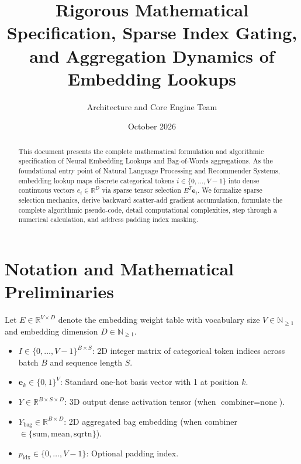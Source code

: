 \documentclass[11pt,a4paper]{article}
\title{\textbf{Rigorous Mathematical Specification, Sparse Index Gating, and Aggregation Dynamics of Embedding Lookups}}
\author{Architecture and Core Engine Team}
\date{October 2026}
\theoremstyle{definition}
\begin{document}
\maketitle

\begin{abstract}
This document presents the complete mathematical formulation and algorithmic specification of Neural Embedding Lookups and Bag-of-Words aggregations. As the foundational entry point of Natural Language Processing and Recommender Systems, embedding lookup maps discrete categorical tokens $i \in \{0, \dots, V-1\}$ into dense continuous vectors $e_i \in \mathbb{R}^D$ via sparse tensor selection $E^T \mathbf{e}_i$. We formalize sparse selection mechanics, derive backward scatter-add gradient accumulation, formulate the complete algorithmic pseudo-code, detail computational complexities, step through a numerical calculation, and address padding index masking.
\end{abstract}

\section{Notation and Mathematical Preliminaries}

Let $E \in \mathbb{R}^{V \times D}$ denote the embedding weight table with vocabulary size $V \in \mathbb{N}_{\ge 1}$ and embedding dimension $D \in \mathbb{N}_{\ge 1}$.

\begin{itemize}
    \item $I \in \{0, \dots, V-1\}^{B \times S}$: 2D integer matrix of categorical token indices across batch $B$ and sequence length $S$.
    \item $\mathbf{e}_k \in \{0, 1\}^V$: Standard one-hot basis vector with 1 at position $k$.
    \item $Y \in \mathbb{R}^{B \times S \times D}$: 3D output dense activation tensor (when $\text{combiner} = \text{none}$).
    \item $Y_{\text{bag}} \in \mathbb{R}^{B \times D}$: 2D aggregated bag embedding (when combiner $\in \{\text{sum}, \text{mean}, \text{sqrtn}\}$).
    \item $p_{\text{idx}} \in \{0, \dots, V-1\}$: Optional padding index.
\end{itemize}
\end{document}
